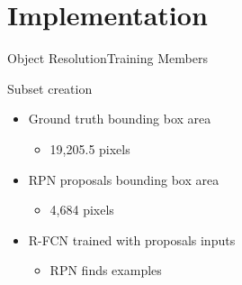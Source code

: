 \section{Implementation}
\begin{frame}{Object Resolution}{Training Members}
        \begin{block}{Subset creation}
        \begin{itemize}
            \item Ground truth bounding box area
            \begin{itemize}
                \item 19,205.5 pixels
            \end{itemize}
            \item RPN proposals bounding box area
            \begin{itemize}
                \item 4,684 pixels
            \end{itemize}
            \item R-FCN trained with proposals inputs
            \begin{itemize}
                \item RPN finds examples
            \end{itemize}
        \end{itemize}
    \end{block}
\end{frame}

